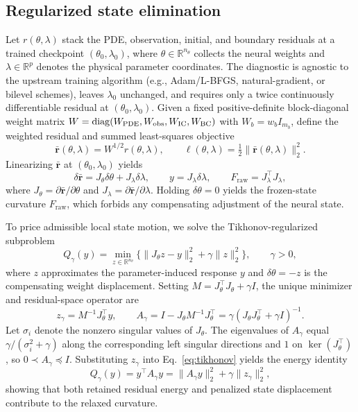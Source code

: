\documentclass[preprint,11pt]{elsarticle}
\newcommand{\RR}{\mathbb R}
\newcommand{\rbar}{\bar{\bm r}}
\newcommand{\Jt}{J_\theta}\newcommand{\Jl}{J_\lambda}
\newcommand{\Fraw}{F_{\mathrm{raw}}}
\begin{document}
\subsection{Regularized state elimination}
\label{sec:elimination}

Let $r(\theta,\lambda)$ stack the PDE, observation, initial, and boundary residuals at a trained checkpoint $(\theta_0,\lambda_0)$, where $\theta\in\RR^{n_\theta}$ collects the neural weights and $\lambda\in\RR^p$ denotes the physical parameter coordinates.
The diagnostic is agnostic to the upstream training algorithm (e.g., Adam/L-BFGS, natural-gradient, or bilevel schemes), leaves $\lambda_0$ unchanged, and requires only a twice continuously differentiable residual at $(\theta_0,\lambda_0)$.
Given a fixed positive-definite block-diagonal weight matrix $W=\operatorname{diag}(W_{\rm PDE},W_{\rm obs},W_{\rm IC},W_{\rm BC})$ with $W_b=w_b I_{m_b}$, define the weighted residual and summed least-squares objective
\begin{equation}
 \rbar(\theta,\lambda)=W^{1/2}r(\theta,\lambda),\qquad
 \ell(\theta,\lambda)=\tfrac12\|\rbar(\theta,\lambda)\|_2^2.
 \label{eq:weighted_residual}
\end{equation}
Linearizing $\rbar$ at $(\theta_0,\lambda_0)$ yields
\begin{equation}
 \delta\rbar=\Jt\delta\theta+\Jl\delta\lambda,\qquad
 y=\Jl\delta\lambda,\qquad
 \Fraw=\Jl^\top\Jl,
 \label{eq:linearization}
\end{equation}
where $\Jt=\partial\rbar/\partial\theta$ and $\Jl=\partial\rbar/\partial\lambda$.
Holding $\delta\theta=0$ yields the frozen-state curvature $\Fraw$, which forbids any compensating adjustment of the neural state.

To price admissible local state motion, we solve the Tikhonov-regularized subproblem
\begin{equation}
 Q_\gamma(y)=\min_{z\in\RR^{n_\theta}}\bigl\{\|\Jt z-y\|_2^2+\gamma\|z\|_2^2\bigr\},\qquad \gamma>0,
 \label{eq:tikhonov}
\end{equation}
where $z$ approximates the parameter-induced response $y$ and $\delta\theta=-z$ is the compensating weight displacement.
Setting $M=\Jt^\top\Jt+\gamma I$, the unique minimizer and residual-space operator are
\begin{equation}
 z_\gamma=M^{-1}\Jt^\top y,\qquad
 A_\gamma=I-\Jt M^{-1}\Jt^\top=\gamma(\Jt\Jt^\top+\gamma I)^{-1}.
 \label{eq:agamma}
\end{equation}
Let $\sigma_i$ denote the nonzero singular values of $\Jt$.
The eigenvalues of $A_\gamma$ equal $\gamma/(\sigma_i^2+\gamma)$ along the corresponding left singular directions and $1$ on $\ker(\Jt^\top)$, so $0\prec A_\gamma\preceq I$.
Substituting $z_\gamma$ into Eq.~\eqref{eq:tikhonov} yields the energy identity
\begin{equation}
 Q_\gamma(y)=y^\top A_\gamma y=\|A_\gamma y\|_2^2+\gamma\|z_\gamma\|_2^2,
 \label{eq:energy_identity}
\end{equation}
showing that both retained residual energy and penalized state displacement contribute to the relaxed curvature.
\end{document}

